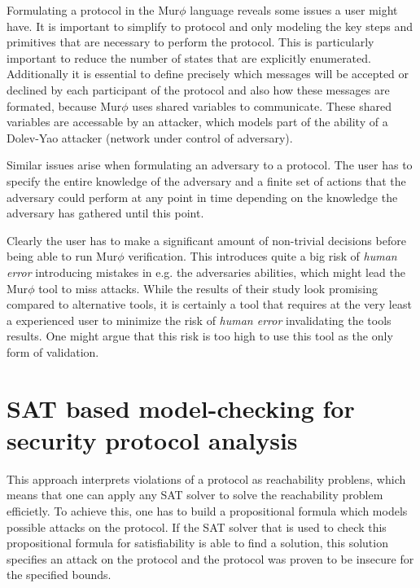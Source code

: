 \documentclass[a4paper,UKenglish]{lipics-v2018}
\def\murphi{Mur$\phi$ }
\begin{document}
Formulating a protocol in the \murphi language reveals some issues a user might have. It is important to simplify to protocol and only modeling the key steps and primitives that are necessary to perform the protocol. This is particularly important to reduce the number of states that are explicitly enumerated. Additionally it is essential to define precisely which messages will be accepted or declined by each participant of the protocol and also how these messages are formated, because \murphi uses shared variables to communicate. These shared variables are accessable by an attacker, which models part of the ability of a Dolev-Yao attacker (network under control of adversary).\cite{murphi}

Similar issues arise when formulating an adversary to a protocol. The user has to specify the entire knowledge of the adversary and a finite set of actions that the adversary could perform at any point in time depending on the knowledge the adversary has gathered until this point.\cite{murphi}

Clearly the user has to make a significant amount of non-trivial decisions before being able to run \murphi verification. This introduces quite a big risk of \textit{human error} introducing mistakes in e.g. the adversaries abilities, which might lead the \murphi tool to miss attacks. While the results of their study look promising compared to alternative tools, it is certainly a tool that requires at the very least a experienced user to minimize the risk of \textit{human error} invalidating the tools results. One might argue that this risk is too high to use this tool as the only form of validation.






\section{SAT based model-checking for security protocol analysis}

This approach interprets violations of a protocol as reachability problens, which means that one can apply any SAT solver to solve the reachability problem efficietly. To achieve this, one has to build a propositional formula which models possible attacks on the protocol. If the SAT solver that is used to check this propositional formula for satisfiability is able to find a solution, this solution specifies an attack on the protocol and the protocol was proven to be insecure for the specified bounds.\cite{sat}
\end{document}
